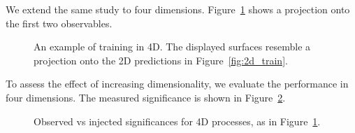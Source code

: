 \documentclass[paper/ddppaper2.tex]{subfiles}
\begin{document}
We extend the same study to four dimensions. Figure~\ref{fig:4d_train} shows a projection onto the first two observables.

\begin{figure}
    \caption{An example of training in 4D. The displayed surfaces resemble a projection onto the 2D predictions in Figure~\ref{fig:2d_train}.}
    \label{fig:4d_train}
\end{figure}

To assess the effect of increasing dimensionality, we evaluate the performance in four dimensions. The measured significance is shown in Figure~\ref{fig:4d_significances}.

\begin{figure}
    \caption{Observed vs injected significances for 4D processes, as in Figure~\ref{fig:4d_train}.}
    \label{fig:4d_significances}
\end{figure}
\end{document}
